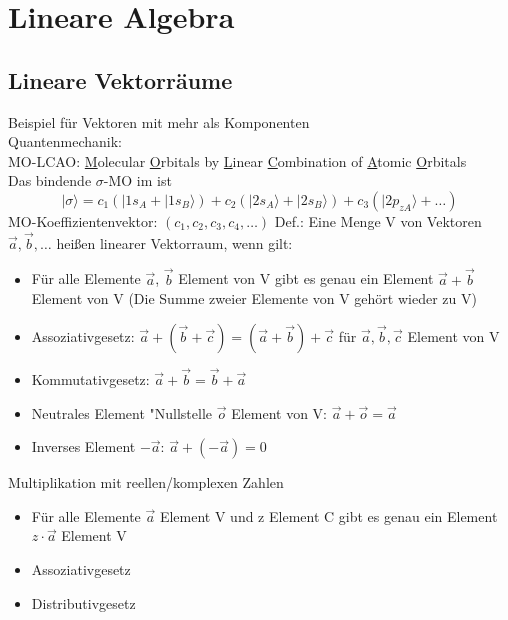 \documentclass{article}
\begin{document}
\tableofcontents
\newpage
\section{Lineare Algebra}
\subsection{Lineare Vektorräume}
Beispiel für Vektoren mit mehr als Komponenten\\
\hspace*{1cm} Quantenmechanik:\\
\hspace*{1cm} MO-LCAO: \underline{M}olecular \underline{O}rbitals by \underline{L}inear \underline{C}ombination of \underline{A}tomic \underline{O}rbitals\\
Das bindende $\sigma$-MO im  ist
\begin{equation*}
    |\sigma\rangle =c_1(|1s_A+|1s_B\rangle )+c_2(|2s_A\rangle +|2s_B\rangle )+c_3(|2p_{zA}\rangle +\dots)
\end{equation*}
MO-Koeffizientenvektor: $(c_1,c_2,c_3,c_4,\dots)$
Def.: Eine Menge V von Vektoren {${\vec{a},\vec{b},\dots}$} heißen linearer Vektorraum, wenn gilt:
\vspace*{1cm}
\begin{itemize}
    \item Für alle Elemente $\vec{a}$, $\vec{b}$ Element von V gibt es genau ein Element $\vec{a} + \vec{b}$ Element von V (Die Summe zweier Elemente von V gehört wieder zu V)
    \item Assoziativgesetz: $\vec{a}+(\vec{b}+\vec{c}) = (\vec{a}+\vec{b})+\vec{c}$ für $\vec{a}, \vec{b}, \vec{c}$ Element von V
    \item Kommutativgesetz: $\vec{a}+\vec{b} = \vec{b} + \vec{a}$
    \item Neutrales Element "Nullstelle $\vec{o}$ Element von V: $\vec{a} + \vec{o} = \vec{a}$
    \item Inverses Element $-\vec{a}$: $\vec{a} + (-\vec{a}) = 0$
\end{itemize}
Multiplikation mit reellen/komplexen Zahlen
\begin{itemize}
    \item Für alle Elemente $\vec{a}$ Element V und z Element C gibt es genau ein Element $z\cdot\vec{a}$ Element V
    \item Assoziativgesetz
    \item Distributivgesetz
\end{itemize}
\end{document}
